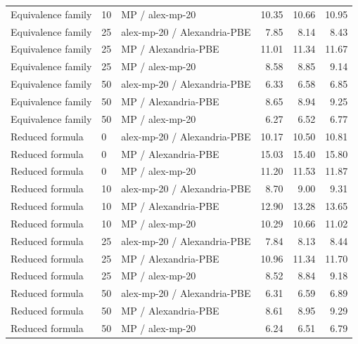 \begin{longtable}{@{}P{0.18\textwidth}P{0.08\textwidth}P{0.28\textwidth}rrr@{}}
Equivalence family & 10 & MP / alex-mp-20 & 10.35 & 10.66 & 10.95 \\
Equivalence family & 25 & alex-mp-20 / Alexandria-PBE & 7.85 & 8.14 & 8.43 \\
Equivalence family & 25 & MP / Alexandria-PBE & 11.01 & 11.34 & 11.67 \\
Equivalence family & 25 & MP / alex-mp-20 & 8.58 & 8.85 & 9.14 \\
Equivalence family & 50 & alex-mp-20 / Alexandria-PBE & 6.33 & 6.58 & 6.85 \\
Equivalence family & 50 & MP / Alexandria-PBE & 8.65 & 8.94 & 9.25 \\
Equivalence family & 50 & MP / alex-mp-20 & 6.27 & 6.52 & 6.77 \\
Reduced formula & 0 & alex-mp-20 / Alexandria-PBE & 10.17 & 10.50 & 10.81 \\
Reduced formula & 0 & MP / Alexandria-PBE & 15.03 & 15.40 & 15.80 \\
Reduced formula & 0 & MP / alex-mp-20 & 11.20 & 11.53 & 11.87 \\
Reduced formula & 10 & alex-mp-20 / Alexandria-PBE & 8.70 & 9.00 & 9.31 \\
Reduced formula & 10 & MP / Alexandria-PBE & 12.90 & 13.28 & 13.65 \\
Reduced formula & 10 & MP / alex-mp-20 & 10.29 & 10.66 & 11.02 \\
Reduced formula & 25 & alex-mp-20 / Alexandria-PBE & 7.84 & 8.13 & 8.44 \\
Reduced formula & 25 & MP / Alexandria-PBE & 10.96 & 11.34 & 11.70 \\
Reduced formula & 25 & MP / alex-mp-20 & 8.52 & 8.84 & 9.18 \\
Reduced formula & 50 & alex-mp-20 / Alexandria-PBE & 6.31 & 6.59 & 6.89 \\
Reduced formula & 50 & MP / Alexandria-PBE & 8.61 & 8.95 & 9.29 \\
Reduced formula & 50 & MP / alex-mp-20 & 6.24 & 6.51 & 6.79 \\
\end{longtable}

